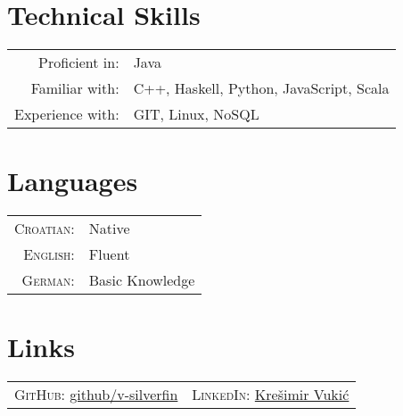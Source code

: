 \documentclass[a4paper,10pt]{article} %
\begin{document}
  \vspace{5mm}
  
  
  \section{Technical Skills}
  
  \begin{tabular}{rl}
      Proficient in:   &  Java \\
      Familiar with:   &  C++, Haskell, Python, JavaScript, Scala \\
      Experience with: &  GIT, Linux, NoSQL \\
  \end{tabular}
  
  \vspace{5mm}
  
  \section{Languages}
  
  \begin{tabular}{rl}
    \textsc{Croatian: } &  Native \\
    \textsc{English: }  &  Fluent \\
    \textsc{German: }   &  Basic Knowledge \\
  \end{tabular}
  
  \vspace{5mm}
  
  \section{Links}
  
  \begin{tabular}{rl}
    \textsc{GitHub: }   \href{https://github.com/v-silverfin}{github/v-silverfin} &
    \textsc{LinkedIn: } \href{linkedin.com/in/krešimir-vukić-b6956040}{Krešimir Vukić} \\
  \end{tabular}
  
\end{document}
